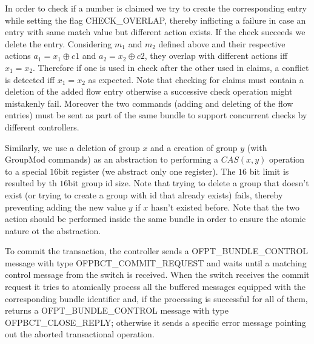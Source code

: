 \documentclass[conference]{sigcomm-alternate}
\newcommand{\concat}[0]{\oplus}
\begin{document}
In order to check if a number is claimed we try to create the corresponding entry while setting the
flag \textsf{CHECK\_OVERLAP}, thereby inflicting a failure in case an entry with same match value but different action exists. If the check succeeds we delete the entry. Considering $m_1$ and $m_2$ defined above and their respective actions $a_1=x_1\concat c1$ and $a_2=x_2\concat c2$,  they overlap with different actions iff $x_1=x_2$. Therefore if one is used in check after the other used in claims, a conflict is detected iff $x_1=x_2$ as expected.
Note that checking for claims must contain a deletion of the added flow entry otherwise a successive check operation might mistakenly fail. Moreover the two commands (adding and deleting of the flow entries) must be sent as part of the same bundle to support concurrent checks by different controllers.

Similarly, we use a deletion of group $x$ and a creation of group $y$ (with GroupMod commands) as an
abstraction to performing a $CAS(x,y)$ operation to a special $16$bit register (we abstract only one register). The $16$ bit limit is resulted by th $16$bit group id size. 
Note that trying to delete a group that doesn't exist (or trying to create a group with id that already exists) fails, thereby preventing adding the new value $y$ if $x$ hasn't existed before. Note that the two action should be performed inside the same bundle in order to ensure the atomic nature ot the abstraction.

To commit the transaction,  the controller sends a \textsf{OFPT\_BUNDLE\_CONTROL} message with type
\textsf{OFPBCT\_COMMIT\_REQUEST} and waits until a matching control
message from the switch is received. When the switch receives the
commit request it tries to atomically process all the buffered messages
equipped with the corresponding bundle identifier and, if the
processing is successful for all of them, returns  a \textsf{OFPT\_BUNDLE\_CONTROL} message with type
\textsf{OFPBCT\_CLOSE\_REPLY}; otherwise it sends a specific error
message  pointing out the aborted transactional operation.



\end{document}
